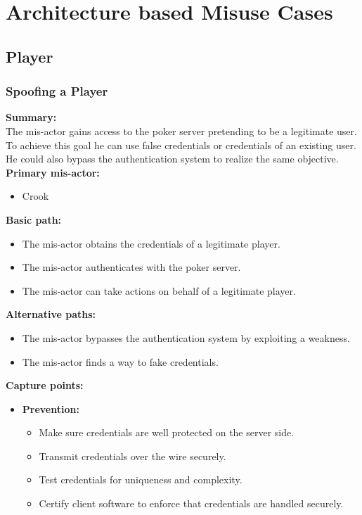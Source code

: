 \documentclass[a4paper,11pt]{report}
\begin{document}
\section{Architecture based Misuse Cases}
\subsection{Player}
\subsubsection{Spoofing a Player}
\textbf{Summary:} \\
The mis-actor gains access to the poker server pretending to be a legitimate user. To achieve this goal he can use false credentials or credentials of an existing user. He could also bypass the authentication system to realize the same objective. \\
\textbf{Primary mis-actor:}
\begin{itemize}
\item Crook
\end{itemize}
\textbf{Basic path:}
\begin{itemize}
\item The mis-actor obtains the credentials of a legitimate player.
\item The mis-actor authenticates with the poker server.
\item The mis-actor can take actions on behalf of a legitimate player.
\end{itemize}
\textbf{Alternative paths:}
\begin{itemize}
\item The mis-actor bypasses the authentication system by exploiting a weakness.
\item The mis-actor finds a way to fake credentials.
\end{itemize}
\textbf{Capture points:}
\begin{itemize}
\item \textbf{Prevention:}
\begin{itemize}
\item Make sure credentials are well protected on the server side.
\item Transmit credentials over the wire securely.
\item Test credentials for uniqueness and complexity.
\item Certify client software to enforce that credentials are handled securely.
\end{itemize}
\end{itemize}
\end{document}
